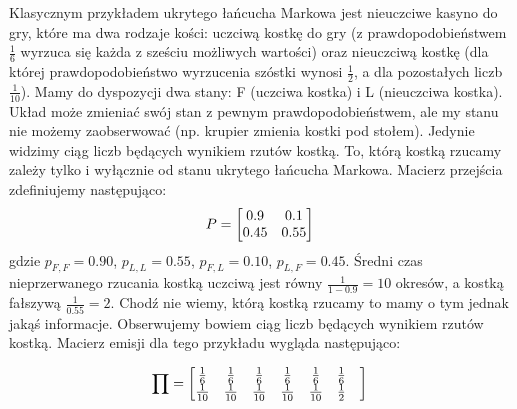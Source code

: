 \begin{przyklad}
	Klasycznym przykładem ukrytego łańcucha Markowa jest nieuczciwe kasyno do gry, które ma dwa rodzaje kości: uczciwą kostkę do gry (z prawdopodobieństwem $\frac{1}{6}$ wyrzuca się każda z sześciu możliwych wartości) oraz nieuczciwą kostkę (dla której prawdopodobieństwo wyrzucenia szóstki wynosi $\frac{1}{2}$, a dla pozostałych liczb $\frac{1}{10}$). Mamy do dyspozycji dwa stany: F (uczciwa kostka) i L (nieuczciwa kostka). Układ może zmieniać swój stan z pewnym prawdopodobieństwem, ale my stanu nie możemy zaobserwować (np. krupier zmienia kostki pod stołem). Jedynie widzimy ciąg liczb będących wynikiem rzutów kostką. To, którą kostką rzucamy zależy tylko i wyłącznie od stanu ukrytego łańcucha Markowa. Macierz przejścia zdefiniujemy następująco:
	\[
		P = 
		\begin{bmatrix}
		0.9 & 0.1 \\
		0.45 & 0.55 
		\end{bmatrix}\\
	\]
	gdzie $p_{F,F}=0.90$, $p_{L,L}=0.55$, $p_{F,L}=0.10$, $p_{L,F}=0.45$. Średni czas nieprzerwanego rzucania kostką uczciwą jest równy $\frac{1}{1-0.9} = 10$ okresów, a kostką fałszywą $ \frac{1}{0.55} = 2$. Chodź nie wiemy, którą kostką rzucamy to mamy o tym jednak jakąś informacje. Obserwujemy bowiem ciąg liczb będących wynikiem rzutów kostką. Macierz emisji dla tego przykładu wygląda następująco:
	
	\[
	\prod = 
	\begin{bmatrix}
	\frac{1}{6} & \frac{1}{6} & \frac{1}{6} & \frac{1}{6} & \frac{1}{6} & \frac{1}{6} \\
	\frac{1}{10} & \frac{1}{10} & \frac{1}{10} & \frac{1}{10} & \frac{1}{10} & \frac{1}{2} &
	\end{bmatrix}\\
	\]
		 
\end{przyklad}

